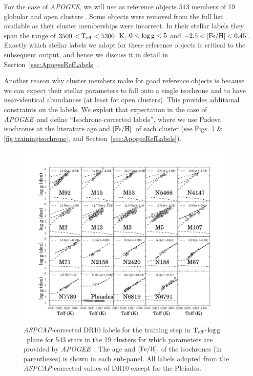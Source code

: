 \documentclass[12pt, preprint]{aastex}
\newcommand{\sectionname}{Section}
\newcommand{\apogee}{\textsl{APOGEE}}
\newcommand{\aspcap}{\textsl{ASPCAP}}
\newcommand{\teff}{\mbox{$\rm T_{eff}$}}
\newcommand{\feh}{\mbox{$\rm [Fe/H]$}}
\newcommand{\logg}{\mbox{$\rm \log g$}}
\begin{document}
For the case of \apogee, we will use as reference objects 543 members of 19 globular and open clusters \citep{Meszaros2013}. Some objects were removed from the full list available as their cluster memberships were incorrect. In their stellar labels they span the range of $3500<\teff<5300$~K, $0<\logg<5$ and $-2.5<\feh<0.45$. 
Exactly which stellar labels we adopt for these reference objects is critical to the subsequent output, and hence 
we discuss it in detail in \sectionname~\ref{sec:ApogeeRefLabels} .

Another reason why cluster members make for good reference objects is because we can expect their stellar parameters to fall onto a single isochrone and to have near-identical abundances (at least for open clusters). This provides additional constraints on the labels.
We exploit that expectation in the case of \apogee\ and define ``Isochrone-corrected labels'', where we use Padova isochrones at the literature age and \feh\ of each cluster (see Figs. \ref{fig:trainingaspcap} \& \ref{fig:trainingisochrone}, and \sectionname~\ref{sec:ApogeeRefLabels}).


\begin{figure}[h!]
\centering
    \includegraphics[scale=0.31]{./plots/training_aspcap2.pdf}
\caption{\aspcap-corrected DR10 labels  for the training step in \teff-\logg\ plane for 543 stars in the 19 clusters for which parameters are provided by \apogee\ \citep{Meszaros2013}. The age and \feh\ of the isochrones (in parentheses) is shown in each sub-panel. All labels adopted from the \aspcap-corrected values of DR10 except for the Pleiades. }
\label{fig:trainingaspcap}
\end{figure}
\end{document}

